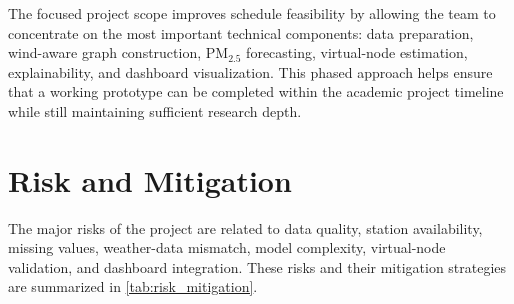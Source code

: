 The focused project scope improves schedule feasibility by allowing the team to concentrate on the most important technical components: data preparation, wind-aware graph construction, PM$_{2.5}$ forecasting, virtual-node estimation, explainability, and dashboard visualization. This phased approach helps ensure that a working prototype can be completed within the academic project timeline while still maintaining sufficient research depth.

\section{Risk and Mitigation}
The major risks of the project are related to data quality, station availability, missing values, weather-data mismatch, model complexity, virtual-node validation, and dashboard integration. These risks and their mitigation strategies are summarized in \cref{tab:risk_mitigation}.

